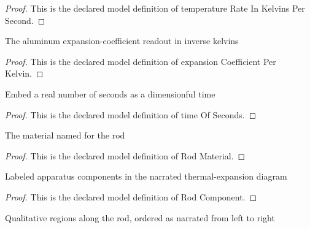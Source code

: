 \begin{proof}
  This is the declared model definition of temperature Rate In Kelvins Per Second.
\end{proof}
\begin{definition}
  \label{def:physics:phyx-mini-0156:phyxminiproblems-problemphyxmini0156-expansioncoefficientperkelvin}
  The aluminum expansion-coefficient readout in inverse kelvins
\end{definition}
\begin{proof}
  This is the declared model definition of expansion Coefficient Per Kelvin.
\end{proof}
\begin{definition}
  \label{def:physics:phyx-mini-0156:phyxminiproblems-problemphyxmini0156-timeofseconds}
  Embed a real number of seconds as a dimensionful time
\end{definition}
\begin{proof}
  This is the declared model definition of time Of Seconds.
\end{proof}
\begin{definition}
  \label{def:physics:phyx-mini-0156:phyxminiproblems-problemphyxmini0156-rodmaterial}
  The material named for the rod
\end{definition}
\begin{proof}
  This is the declared model definition of Rod Material.
\end{proof}
\begin{definition}
  \label{def:physics:phyx-mini-0156:phyxminiproblems-problemphyxmini0156-rodcomponent}
  Labeled apparatus components in the narrated thermal-expansion diagram
\end{definition}
\begin{proof}
  This is the declared model definition of Rod Component.
\end{proof}
\begin{definition}
  \label{def:physics:phyx-mini-0156:phyxminiproblems-problemphyxmini0156-rodregion}
  Qualitative regions along the rod, ordered as narrated from left to right
\end{definition}
